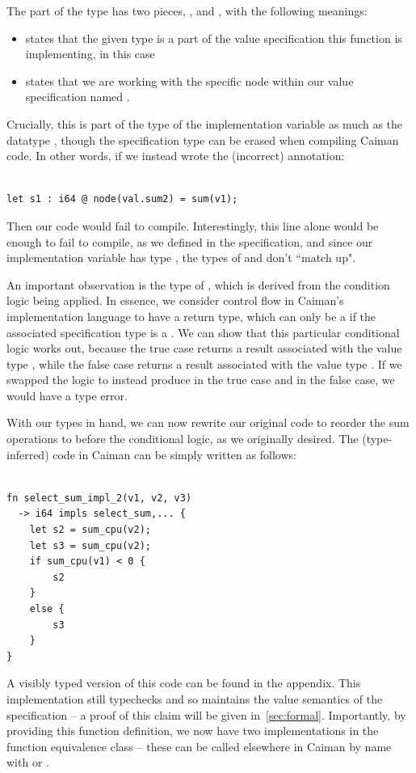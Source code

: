 The part of the type  has two pieces, , and , with the following meanings:
%
\begin{itemize}
\item {} states that the given type is a part of the value specification this function is implementing,  in this case
\item {} states that we are working with the specific node within our value specification named .
\end{itemize}
%
Crucially, this is part of the type of the implementation variable as much as the datatype , though the specification type can be erased when compiling Caiman code.  In other words, if we instead wrote the (incorrect) annotation:
%
\begin{lstlisting}

let s1 : i64 @ node(val.sum2) = sum(v1);
\end{lstlisting}
%
Then our code would fail to compile.  Interestingly, this line alone would be enough to fail to compile, as we defined  in the specification, and since our implementation variable  has type , the types of  and  don't ``match up".

An important observation is the type of , which is derived from the  condition logic being applied.  In essence, we consider control flow in Caiman's implementation language to have a return type, which can only be a  if the associated specification type is a .  We can show that this particular conditional logic works out, because the true case returns a result associated with the value type , while the false case returns a result associated with the value type .  If we swapped the logic to instead produce  in the true case and  in the false case, we would have a type error.

With our types in hand, we can now rewrite our original code to reorder the sum operations to before the conditional logic, as we originally desired.  The (type-inferred) code in Caiman can be simply written as follows:
%
\begin{lstlisting}

fn select_sum_impl_2(v1, v2, v3) 
  -> i64 impls select_sum,... {
    let s2 = sum_cpu(v2);
    let s3 = sum_cpu(v2);
    if sum_cpu(v1) < 0 {
        s2
    }
    else {
        s3
    }
}
\end{lstlisting}
%
A visibly typed version of this code can be found in the appendix.  This implementation still typechecks and so maintains the value semantics of the  specification -- a proof of this claim will be given in~\ref{sec:formal}.  Importantly, by providing this function definition, we now have two implementations in the  function equivalence class -- these can be called elsewhere in Caiman by name with  or .

